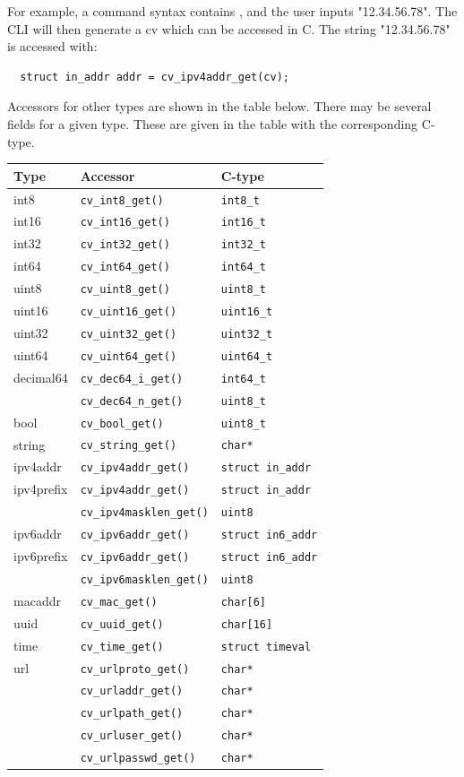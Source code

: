 \documentclass[a4paper, 10pt] {article}
\begin{document}
For example, a command syntax contains {\tt <addr:ipv4addr>}, and
the user inputs "12.34.56.78". The CLI will then generate a cv which
can be accessed in C. The string
"12.34.56.78" is accessed with:
\begin{verbatim}
  struct in_addr addr = cv_ipv4addr_get(cv);
\end{verbatim}

Accessors for other types are shown in the table
below. There may be several fields for a given type. These are given
in the table with the corresponding C-type.

\begin{tabular}{ | l | l | l | }
\hline
  \textbf{ Type} & \textbf{Accessor} & \textbf{C-type}\\
\hline
int8   & {\tt cv\_int8\_get()}   & {\tt int8\_t} \\
int16  & {\tt cv\_int16\_get()}  & {\tt int16\_t} \\
int32  & {\tt cv\_int32\_get()}  & {\tt int32\_t} \\
int64  & {\tt cv\_int64\_get()}  & {\tt int64\_t} \\
uint8  & {\tt cv\_uint8\_get()}  & {\tt uint8\_t} \\
uint16 & {\tt cv\_uint16\_get()} & {\tt uint16\_t} \\
uint32 & {\tt cv\_uint32\_get()} & {\tt uint32\_t} \\
uint64 & {\tt cv\_uint64\_get()} & {\tt uint64\_t} \\
decimal64 & {\tt cv\_dec64\_i\_get()} & {\tt int64\_t}\\
           & {\tt cv\_dec64\_n\_get()} & {\tt uint8\_t}\\
bool & {\tt cv\_bool\_get()} & {\tt uint8\_t} \\
string & {\tt cv\_string\_get()} & {\tt char*} \\
ipv4addr   & {\tt cv\_ipv4addr\_get()} & {\tt struct in\_addr}\\
ipv4prefix & {\tt cv\_ipv4addr\_get()} & {\tt struct in\_addr}\\
           & {\tt cv\_ipv4masklen\_get()} & {\tt uint8}\\
ipv6addr   & {\tt cv\_ipv6addr\_get()} & {\tt struct in6\_addr}\\
ipv6prefix & {\tt cv\_ipv6addr\_get()} & {\tt struct in6\_addr}\\
           & {\tt cv\_ipv6masklen\_get()} & {\tt uint8}\\
macaddr    & {\tt cv\_mac\_get()} & {\tt char[6]}\\
uuid       & {\tt cv\_uuid\_get()} & {\tt char[16]}\\
time       & {\tt cv\_time\_get()} & {\tt struct timeval}\\
url        & {\tt cv\_urlproto\_get()} & {\tt char*}\\
           & {\tt cv\_urladdr\_get()} & {\tt char*}\\
           & {\tt cv\_urlpath\_get()} & {\tt char*}\\
           & {\tt cv\_urluser\_get()} & {\tt char*}\\
           & {\tt cv\_urlpasswd\_get()} & {\tt char*}\\
\hline
\end{tabular}
\end{document}
